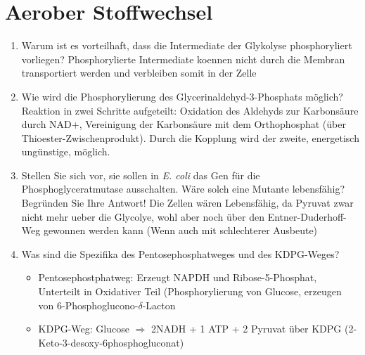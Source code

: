
\section{Aerober Stoffwechsel}
\begin{enumerate}
	\item Warum ist es vorteilhaft, dass die Intermediate der Glykolyse phosphoryliert vorliegen?
		Phosphorylierte Intermediate koennen nicht durch die Membran transportiert werden und verbleiben somit in der Zelle
	\item Wie wird die Phosphorylierung des Glycerinaldehyd-3-Phosphats möglich?
		Reaktion in zwei Schritte aufgeteilt:
		Oxidation des Aldehyds zur Karbons\"aure durch NAD+, Vereinigung der Karbons\"aure mit dem Orthophosphat (\"uber Thioester-Zwischenprodukt). Durch die Kopplung wird der zweite, energetisch ung\"unstige, m\"oglich.
	\item Stellen Sie sich vor, sie sollen in \emph{E. coli} das Gen für die Phosphoglyceratmutase ausschalten. Wäre solch eine Mutante lebensfähig? Begründen Sie Ihre Antwort! 
		Die Zellen w\"aren Lebensf\"ahig, da Pyruvat zwar nicht mehr ueber die Glycolye, wohl aber noch \"uber den Entner-Duderhoff-Weg gewonnen werden kann 		    (Wenn auch mit schlechterer Ausbeute)
	\item Was sind die Spezifika des Pentosephosphatweges und des KDPG-Weges?
		\begin{itemize}
			\item Pentosephostphatweg: Erzeugt NAPDH und Ribose-5-Phosphat, Unterteilt in Oxidativer Teil (Phosphorylierung von Glucose, erzeugen von 6-Phosphoglucono-$\delta$-Lacton
			\item KDPG-Weg: Glucose $\Rightarrow$  2NADH + 1 ATP + 2 Pyruvat \"uber KDPG (2-Keto-3-desoxy-6phosphogluconat)
		\end{itemize}	
	

\end{enumerate}
